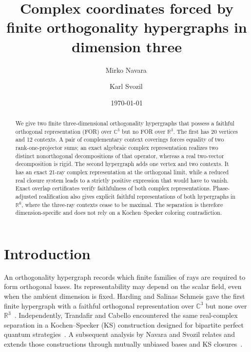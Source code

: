 \documentclass[twocolumn,aps,pra,floatfix,amsmath,amssymb,longbibliography]{revtex4-2}
\theoremstyle{definition}
\theoremstyle{remark}
\newcommand{\C}{\mathbb C}
\newcommand{\R}{\mathbb R}
\begin{document}
\title{Complex coordinates forced by finite orthogonality hypergraphs in dimension three}

\author{Mirko Navara\,}

\author{Karl Svozil\,}

\date{\today}

\begin{abstract}
We give two finite three-dimensional orthogonality hypergraphs that possess a
faithful orthogonal representation (FOR) over $\C^3$ but no FOR over $\R^3$.
The first has 20 vertices and 12 contexts.  A pair of complementary context
coverings forces equality of two rank-one-projector sums; an exact algebraic
complex representation realizes two distinct nonorthogonal decompositions of
that operator, whereas a real two-vector decomposition is rigid.  The second
hypergraph adds one vertex and two contexts.  It has an exact 21-ray complex
representation at the orthogonal limit, while a reduced real closure system
leads to a strictly positive expression that would have to vanish.  Exact
overlap certificates verify faithfulness of both complex representations.
Phase-adjusted realification also gives explicit faithful representations of
both hypergraphs in $\R^6$, where the three-ray contexts cease to be maximal.
The separation is therefore dimension-specific and does not rely on a
Kochen--Specker coloring contradiction.
\end{abstract}

\maketitle

\section{Introduction}

An orthogonality hypergraph records which finite families of rays are required
to form orthogonal bases.  Its representability may depend on the scalar field,
even when the ambient dimension is fixed.  Harding and Salinas Schmeis gave the
first finite hypergraph with a faithful orthogonal representation over $\C^3$
but none over $\R^3$~\cite{harding2025remarksIJTP}.  Independently, Trandafir
and Cabello encountered the same real-complex separation in a
Kochen--Specker (KS) construction designed for bipartite perfect quantum
strategies~\cite{2024-cabello-trandafir0}.  A subsequent analysis by Navara and
Svozil relates and extends those constructions through mutually unbiased bases
and KS closures~\cite{svozil-2025-MYOCHS}.
\end{document}
